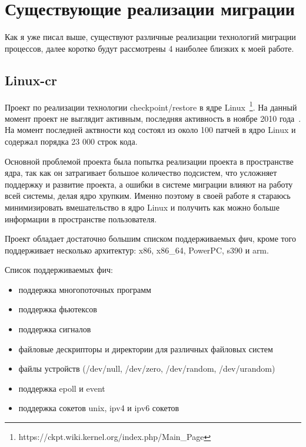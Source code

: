 \section{Существующие реализации миграции}

Как я уже писал выше, существуют различные реализации технологий миграции процессов, далее коротко будут рассмотрены 4 наиболее близких к моей работе.

\subsection{Linux-cr}

Проект по реализации технологии checkpoint/restore в ядре Linux~\footnote{https://ckpt.wiki.kernel.org/index.php/Main\_Page}. На данный момент проект не выглядит активным, последняя активность в ноябре 2010 года~\cite{linux_cr_lwn_report}. На момент последней актвности код состоял из около 100 патчей в ядро Linux и содержал порядка 23 000 строк кода.

Основной проблемой проекта была попытка реализации проекта в пространстве ядра, так как он затрагивает большое количество подсистем, что усложняет поддержку и развитие проекта, а ошибки в системе миграции влияют на работу всей системы, делая ядро хрупким. Именно поэтому в своей работе я стараюсь минимизировать вмешательство в ядро Linux и получить как можно больше информации в пространстве пользователя.

Проект обладает достаточно большим списком поддерживаемых фич, кроме того поддерживает несколько архитектур: x86, x86\_64, PowerPC, s390 и arm.

Список поддерживаемых фич:

\begin{itemize}

    \item поддержка многопоточных программ
    \item поддержка фьютексов
    \item поддержка сигналов
    \item файловые дескрипторы и директории для различных файловых систем
    \item файлы устройств (/dev/null, /dev/zero, /dev/random, /dev/urandom)
    \item поддержка epoll и event
    \item поддержка сокетов unix, ipv4 и ipv6 сокетов

\end{itemize}

